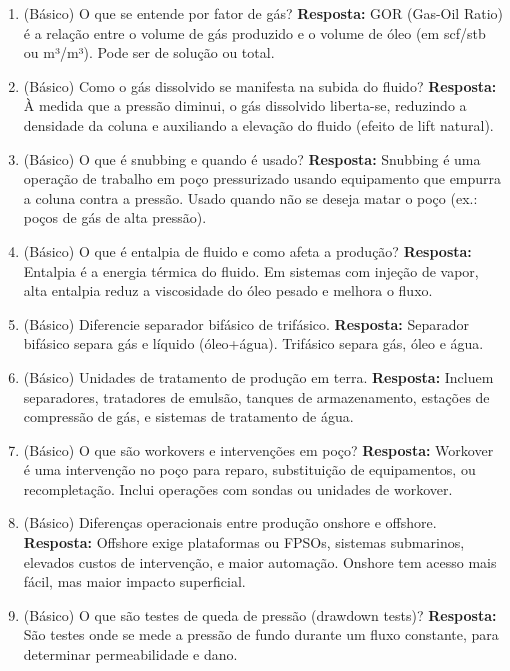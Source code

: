 \documentclass[11pt,a4paper]{article}
\begin{document}
\begin{enumerate}
  \item (Básico) O que se entende por fator de gás?
  \textbf{Resposta:} GOR (Gas-Oil Ratio) é a relação entre o volume de gás produzido e o volume de óleo (em scf/stb ou m³/m³). Pode ser de solução ou total.

  \item (Básico) Como o gás dissolvido se manifesta na subida do fluido?
  \textbf{Resposta:} À medida que a pressão diminui, o gás dissolvido liberta-se, reduzindo a densidade da coluna e auxiliando a elevação do fluido (efeito de lift natural).

  \item (Básico) O que é snubbing e quando é usado?
  \textbf{Resposta:} Snubbing é uma operação de trabalho em poço pressurizado usando equipamento que empurra a coluna contra a pressão. Usado quando não se deseja matar o poço (ex.: poços de gás de alta pressão).

  \item (Básico) O que é entalpia de fluido e como afeta a produção?
  \textbf{Resposta:} Entalpia é a energia térmica do fluido. Em sistemas com injeção de vapor, alta entalpia reduz a viscosidade do óleo pesado e melhora o fluxo.

  \item (Básico) Diferencie separador bifásico de trifásico.
  \textbf{Resposta:} Separador bifásico separa gás e líquido (óleo+água). Trifásico separa gás, óleo e água.

  \item (Básico) Unidades de tratamento de produção em terra.
  \textbf{Resposta:} Incluem separadores, tratadores de emulsão, tanques de armazenamento, estações de compressão de gás, e sistemas de tratamento de água.

  \item (Básico) O que são workovers e intervenções em poço?
  \textbf{Resposta:} Workover é uma intervenção no poço para reparo, substituição de equipamentos, ou recompletação. Inclui operações com sondas ou unidades de workover.

  \item (Básico) Diferenças operacionais entre produção onshore e offshore.
  \textbf{Resposta:} Offshore exige plataformas ou FPSOs, sistemas submarinos, elevados custos de intervenção, e maior automação. Onshore tem acesso mais fácil, mas maior impacto superficial.

  \item (Básico) O que são testes de queda de pressão (drawdown tests)?
  \textbf{Resposta:} São testes onde se mede a pressão de fundo durante um fluxo constante, para determinar permeabilidade e dano.


\end{enumerate}
\end{document}
